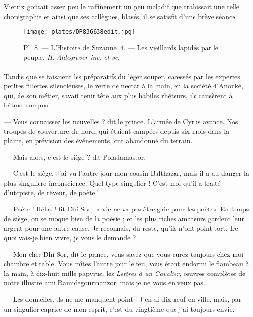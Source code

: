 \documentclass[a4paper, 11pt, oneside, polutonikogreek, french]{article}
\begin{document}
Vietrix goûtait assez peu le raffinement un peu maladif que trahissait une telle chorégraphie et ainsi que ses collègues, blasés, il se satisfit d'une brève séance.

\bigskip
\centerline{\EightStarTaper}
\centerline{\EightStarTaper\EightStarTaper}
\bigskip
\clearpage
\vspace*{\fill}
\begin{figure}[H]
\centering
\texttt{[image: plates/DP836638edit.jpg]}
\caption{Pl. 8. --- L'Histoire de Suzanne. 4. --- Les vieillards lapidés par le peuple. \emph{H. Aldegraver inv. et sc.}}
\end{figure}
\vspace*{\fill}
\clearpage
\paragraph{}
Tandis que se faisaient les préparatifs du léger souper, caressés par les expertes petites fillettes silencieuses, le verre de nectar à la main, en la société d'Anouké, qui, de son métier, savait tenir tête aux plus habiles rhéteurs, ils causèrent à bâtons rompus.

--- Vous connaissez les nouvelles ? dit le prince. L'armée de Cyrus avance. Nos troupes de couverture du nord, qui étaient campées depuis six mois dans la plaine, en prévision des événements, ont abandonné du terrain.

--- Mais alors, c'est le siège ? dit Poladamastor.

--- C'est le siège. J'ai vu l'autre jour mon cousin Balthazar, mais il a du danger la plus singulière inconscience. Quel type singulier ! C'est moi qu'il a traité d'utopiste, de rêveur, de poète !

--- Poète ! Hélas ! fit Dhi-Sor, la vie ne va pas être gaie pour les poètes. En temps de siège, on se moque bien de la poésie ; et les plus riches amateurs gardent leur argent pour une autre cause. Je reconnais, du reste, qu'ils n'ont point tort. De quoi vais-je bien vivre, je vous le demande ?

--- Mon cher Dhi-Sor, dit le prince, vous savez que vous aurez toujours chez moi chambre et table. Vous mîtes l'autre jour le feu, vous étant endormi le flambeau à la main, à dix-huit mille papyrus, les \emph{Lettres à un Cavalier}, œuvres complètes de notre illustre ami Ramidegourmanzor, mais je ne vous en veux pas.

--- Les domiciles, ils ne me manquent point ! J'en ai dix-neuf en ville, mais, par un singulier caprice de mon esprit, c'est du vingtième que j'ai toujours envie.
\end{document}
